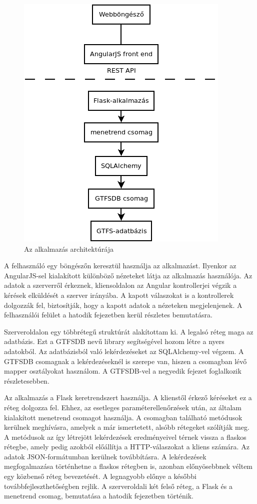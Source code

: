 \begin{figure}[htb]
\centering
\includegraphics[scale=0.7]{kepek/architecture.png}
\caption{Az alkalmazás architektúrája}
\label{fig:architecture}
\end{figure}

A felhasználó egy böngészőn keresztül használja az alkalmazást. Ilyenkor az An\-gu\-lar\-JS-sel kialakított különböző nézeteket látja az alkalmazás használója. Az adatok a szerverről érkeznek, kliensoldalon az Angular kontrollerjei végzik a kérések elküldését a szerver irányába. A kapott válaszokat is a kontrollerek dolgozzák fel, biztosítják, hogy a kapott adatok a nézeteken megjelenjenek. A felhasználói felület a hatodik fejezetben kerül részletes bemutatásra.

Szerveroldalon egy többrétegű struktúrát alakítottam ki. A legalsó réteg maga az adatbázis. Ezt a GTFSDB nevű library segítségével hozom létre a nyers adatokból. Az adatbázisból való lekérdezéseket az SQLAlchemy-vel végzem. A GTFSDB csomagnak a lekérdezéseknél is szerepe van, hiszen a csomagban lévő mapper osztályokat használom. A GTFSDB-vel a negyedik fejezet foglalkozik részletesebben.

Az alkalmazás a Flask keretrendszert használja. A klienstől érkező kéréseket ez a réteg dolgozza fel. Ehhez, az esetleges paraméterellenőrzések után, az általam kialakított menetrend csomagot használja. A csomagban található metódusok kerülnek meghívásra, amelyek a már ismertetett, alsóbb rétegeket szólítják meg. A metódusok az így létrejött lekérdezések eredményeivel térnek vissza a flaskos rétegbe, amely pedig azokból előállítja a HTTP-válaszokat a kliens számára. Az adatok JSON-formátumban kerülnek továbbításra. A lekérdezések megfogalmazása történhetne a flaskos rétegben is, azonban előnyösebbnek véltem egy közbenső réteg bevezetését. A legnagyobb előnye a későbbi továbbfejleszthetőségben rejlik. A szerveroldali két felső réteg, a Flask és a menetrend csomag, bemutatása a hatodik fejezetben történik.
